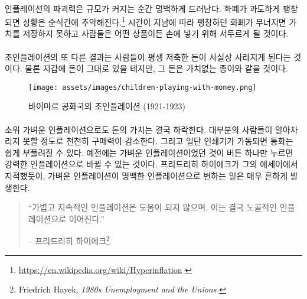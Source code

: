 \paragraph{}
인플레이션의 파괴력은 규모가 커지는 순간 명백하게 드러난다. 
화폐가 과도하게 팽창되면 상황은 순식간에 추악해진다.\footnote{\url{https://en.wikipedia.org/wiki/Hyperinflation} \cite{wiki:hyperinflation}} 
시간이 지남에 따라 팽창하던 화폐가 무너지면 가치를 저장하지 못하고 
사람들은 어떤 상품이든 손에 넣기 위해 서두르게 될 것이다.

\paragraph{}
초인플레이션의 또 다른 결과는 사람들이 평생 저축한 돈이 사실상 사라지게 된다는 것이다. 
물론 지갑에 돈이 그대로 있을 테지만, 그 돈은 가치없는 종이와 같을 것이다.

\begin{figure}
	\texttt{[image: assets/images/children-playing-with-money.png]}
	\caption{바이마르 공화국의 초인플레이션 (1921-1923)}
	\label{fig:children-playing-with-money}
\end{figure}

\paragraph{}
소위 가벼운 인플레이션으로도 돈의 가치는 결국 하락한다. 
대부분의 사람들이 알아차리지 못할 정도로 천천히 구매력이 감소한다. 
그리고 일단 인쇄기가 가동되면 통화는 쉽게 부풀려질 수 있다. 예전에는 가벼운 인플레이션이었던 것이
버튼 하나만 누르면 강력한 인플레이션으로 바뀔 수 있는 것이다.
프리드리히 하이에크가 그의 에세이에서 지적했듯이, 가벼운 인플레이션이 명백한 인플레이션으로 변하는 일은 매우 흔하게 발생한다.

\begin{quotation}\begin{samepage}
		\enquote{가볍고 지속적인 인플레이션은 도움이 되지 않으며, 이는 결국 노골적인 인플레이션으로 이어진다.}
		\begin{flushright} -- 프리드리히 하이에크\footnote{Friedrich Hayek, \textit{1980s
					Unemployment and the Unions} \cite{hayek-inflation}}
\end{flushright}\end{samepage}\end{quotation}

